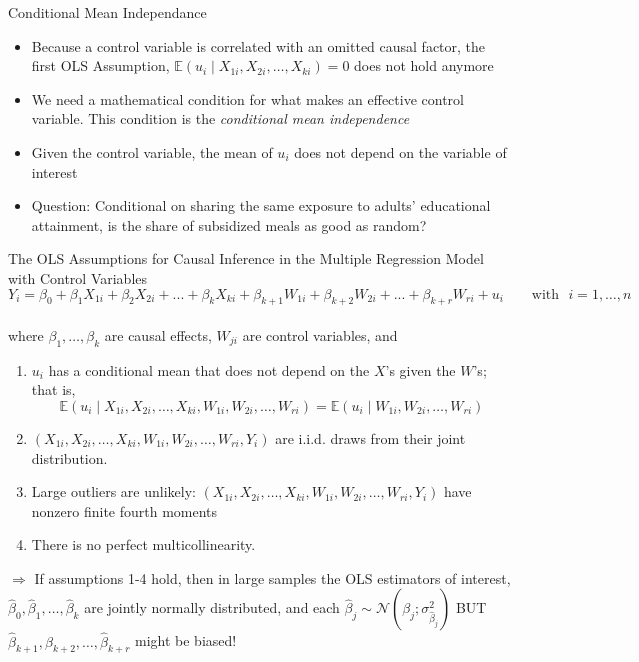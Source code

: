 \documentclass[notes,10pt, aspectratio=169]{beamer}
\begin{document}
\begin{frame}{Conditional Mean Independance}
\begin{itemize}
    \item Because a control variable is correlated with an omitted causal factor, the first OLS Assumption, $\mathbb{E}(u_i \mid X_{1i}, X_{2i}, \dots, X_{ki})=0$ does not hold anymore
    \item We need a mathematical condition for what makes an effective control variable. This condition is the \textit{conditional mean independence}
    \item Given the control variable, the mean of $u_i$ does not depend on the variable of interest
    \item Question: Conditional on sharing the same exposure to adults' educational attainment, is the share of subsidized meals as good as random?
    
\end{itemize}

\end{frame}


\begin{frame}{The OLS Assumptions for Causal Inference
in the Multiple Regression Model with Control Variables}
\begin{equation*}
    Y_i = \beta_{0} + \beta_1 X_{1i} + \beta_2 X_{2i} + ... + \beta_k X_{ki} + \beta_{k+1} W_{1i} + \beta_{k+2} W_{2i} + ... + \beta_{k+r} W_{ri} + u_i \text{~~~~~~with~~} i=1,\dots, n
\end{equation*}\\
\vspace{.5cm}
where $\beta_1, \dots, \beta_k$ are causal effects,  $W_{ji}$ are control variables, and\vspace{.5cm}

\begin{enumerate}
    \item $u_i$ has a conditional mean that does not depend on the $X$’s given the $W$’s; that is,
    \begin{equation*}
        \mathbb{E}(u_i \mid X_{1i}, X_{2i}, \dots, X_{ki},  W_{1i},  W_{2i}, \dots,  W_{ri})=\mathbb{E}(u_i \mid W_{1i},  W_{2i}, \dots,  W_{ri})
    \end{equation*}
    \item $(X_{1i}, X_{2i}, \dots, X_{ki},  W_{1i},  W_{2i}, \dots,  W_{ri}, Y_i)$ are i.i.d. draws from their joint distribution.
    \item Large outliers are unlikely: $(X_{1i}, X_{2i}, \dots, X_{ki},  W_{1i},  W_{2i}, \dots,  W_{ri}, Y_i)$ have nonzero finite fourth moments
    \item There is no perfect multicollinearity.
\end{enumerate}
\vspace{.3cm}
$\Rightarrow$ If assumptions 1-4 hold, then in large samples the OLS estimators of interest, $\hat{\beta}_0, \hat{\beta}_1, \dots, \hat{\beta}_k$ are jointly normally distributed, and each $\hat{\beta}_j\sim \mathcal{N}(\beta_j; \sigma^2_{\hat{\beta}_j})$ BUT $\hat{\beta}_{k+1}, \hat{\beta}_{k+2}, \dots, \hat{\beta}_{k+r}$ might be biased!
\end{frame}
\end{document}
